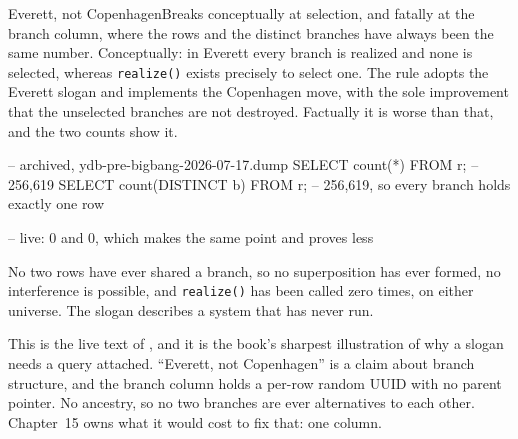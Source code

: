 \begin{Analogy}{Everett, not Copenhagen}{Breaks conceptually at selection, and fatally at the branch column, where the rows and the distinct branches have always been the same number.}
Conceptually: in Everett every branch is realized and none is selected, whereas \texttt{realize()} exists precisely to select one. The rule adopts the Everett slogan and implements the Copenhagen move, with the sole improvement that the unselected branches are not destroyed. Factually it is worse than that, and the two counts show it.
\begin{Check}
-- archived, ydb-pre-bigbang-2026-07-17.dump
SELECT count(*) FROM r;            -- 256,619
SELECT count(DISTINCT b) FROM r;   -- 256,619, so every branch holds exactly one row

-- live: 0 and 0, which makes the same point and proves less
\end{Check}
No two rows have ever shared a branch, so no superposition has ever formed, no interference is possible, and \texttt{realize()} has been called zero times, on either universe. The slogan describes a system that has never run.

This is the live text of , and it is the book's sharpest illustration of why a slogan needs a query attached. ``Everett, not Copenhagen'' is a claim about branch structure, and the branch column holds a per-row random UUID with no parent pointer. No ancestry, so no two branches are ever alternatives to each other. Chapter~15 owns what it would cost to fix that: one column.
\end{Analogy}

